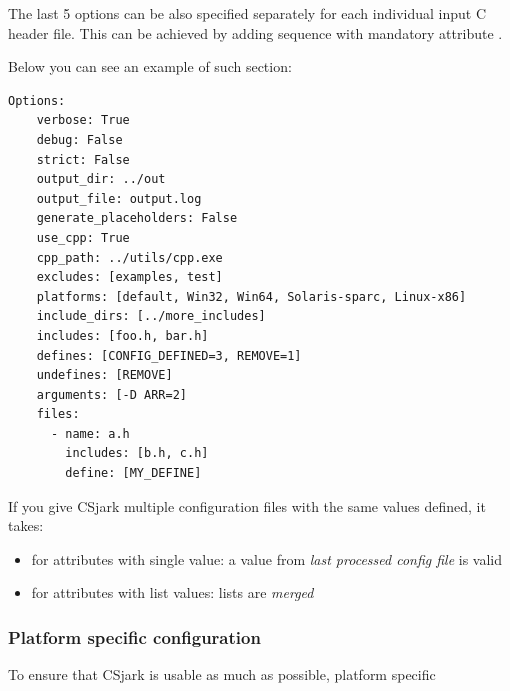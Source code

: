 \documentclass[A4paper,10pt,english]{sphinxmanual}
\begin{document}
The last 5 options can be also specified separately for each individual input C header file. This can be achieved by adding sequence  with mandatory attribute .

Below you can see an example of such  section:

\begin{Verbatim}[commandchars=\\\{\}]
Options:
    verbose: True
    debug: False
    strict: False
    output_dir: ../out
    output_file: output.log
    generate_placeholders: False
    use_cpp: True
    cpp_path: ../utils/cpp.exe
    excludes: [examples, test]
    platforms: [default, Win32, Win64, Solaris-sparc, Linux-x86]
    include_dirs: [../more_includes]
    includes: [foo.h, bar.h]
    defines: [CONFIG_DEFINED=3, REMOVE=1]
    undefines: [REMOVE]
    arguments: [-D ARR=2]
    files:
      - name: a.h
        includes: [b.h, c.h]
        define: [MY_DEFINE]
\end{Verbatim}

If you give CSjark multiple configuration files with the same values defined, it takes:
\begin{itemize}
\item {} 
for attributes with single value: a value from \emph{last processed config file} is valid

\item {} 
for attributes with list values: lists are \emph{merged}

\end{itemize}


\subsubsection{Platform specific configuration}
\label{user/config:platform-specific-configuration}
To ensure that CSjark is usable as much as possible, platform specific
\end{document}
